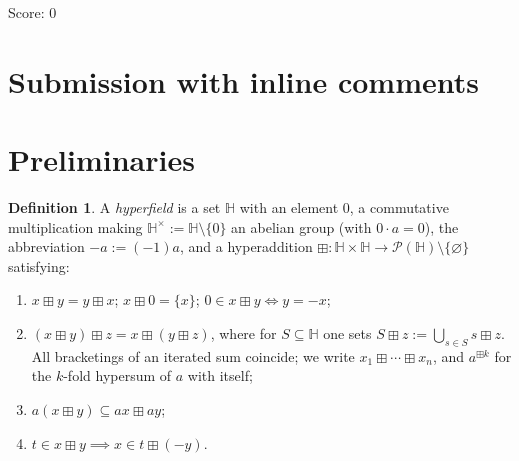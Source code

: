 \documentclass[11pt]{article}
\theoremstyle{definition}
\newtheorem{definition}[theorem]{Definition}
\theoremstyle{remark}
\newcommand{\Hb}{\mathbb{H}}
\newcommand{\bp}{\boxplus}
\begin{document}
\noindent Score: 0

\newpage
\section{Submission with inline comments}


\begin{abstract}
\noindent\textbf{Problem.} Let $\Hb$ be a hyperfield with hyperaddition
$\boxplus$. For $x,y,z\in\Hb$ with $0\in x\bp y\bp z$, does it follow that
$0\in x^{3}\bp y^{3}\bp z^{3}\bp(-xyz)\bp(-xyz)\bp(-xyz)$?

\smallskip\noindent\textbf{Content of this document.} We give complete
proofs, from the hyperfield axioms alone, of the degenerate case $xyz=0$
(Proposition~\ref{prop:degen}) and of the case in which one of the three
pair sums $x\bp y$, $x\bp z$, $y\bp z$ is a singleton
(Corollary~\ref{cor:collapse}). The remaining case is isolated in the
precisely stated Elevation Problem~\ref{prob:elevation}, which is
equivalent to the unrestricted statement; the document proves the
conditional implication (Elevation Problem $\Rightarrow$ full theorem) in
Theorem~\ref{thm:main}. We do not assert the unrestricted answer ``yes''
as proved in this round; no computation, and no external theorem
or unproved lemma is used as a proof step anywhere below.
\end{abstract}

\section{Preliminaries}\label{sec:prelim}

\begin{definition}\label{def:hf}
A \emph{hyperfield} is a set $\Hb$ with an element $0$, a commutative
multiplication making $\Hb^\times:=\Hb\setminus\{0\}$ an abelian group
(with $0\cdot a=0$), the abbreviation $-a:=(-1)a$, and a hyperaddition
$\bp:\Hb\times\Hb\to\mathcal P(\Hb)\setminus\{\varnothing\}$ satisfying:
\begin{enumerate}[label=(H\arabic*)]
\item $x\bp y=y\bp x$;\; $x\bp0=\{x\}$;\; $0\in x\bp y\iff y=-x$;
\item $(x\bp y)\bp z=x\bp(y\bp z)$, where for $S\subseteq\Hb$ one sets
$S\bp z:=\bigcup_{s\in S}s\bp z$. All bracketings of an iterated sum
coincide; we write $x_1\bp\cdots\bp x_n$, and $a^{\bp k}$ for the $k$-fold
hypersum of $a$ with itself;
\item $a(x\bp y)\subseteq ax\bp ay$;
\item $t\in x\bp y\implies x\in t\bp(-y)$.
\end{enumerate}
\end{definition}
\end{document}
